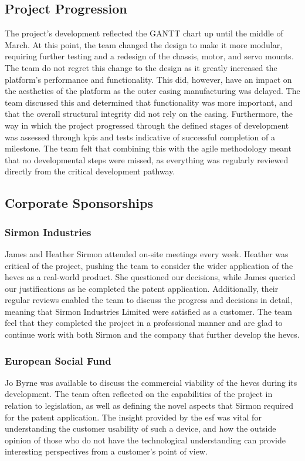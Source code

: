 \documentclass [12pt]{article}
\begin{document}
\subsection{Project Progression}
The project’s development reflected the GANTT chart up until the middle of March. At this point, the team changed the design to make it more modular, requiring further testing and a redesign of the chassis, motor, and servo mounts. The team do not regret this change to the design as it greatly increased the platform’s performance and functionality. This did, however, have an impact on the aesthetics of the platform as the outer casing manufacturing was delayed.  The team discussed this and determined that functionality was more important, and that the overall structural integrity did not rely on the casing. Furthermore, the way in which the project progressed through the defined stages of development was assessed through \gls{kpi}s and tests indicative of successful completion of a milestone. The team felt that combining this with the agile methodology meant that no developmental steps were missed, as everything was regularly reviewed directly from the critical development pathway.  

\subsection{Corporate Sponsorships}

\subsubsection{Sirmon Industries}
James and Heather Sirmon attended on-site meetings every week. Heather was critical of the project, pushing the team to consider the wider application of the \gls{hevcs} as a real-world product. She questioned our decisions, while James queried our justifications as he completed the patent application. Additionally, their regular reviews enabled the team to discuss the progress and decisions in detail, meaning that Sirmon Industries Limited were satisfied as a customer. The team feel that they completed the project in a professional manner and are glad to continue work with both Sirmon and the company that further develop the \gls{hevcs}. 

\subsubsection{European Social Fund}
Jo Byrne was available to discuss the commercial viability of the \gls{hevcs} during its development. The team often reflected on the capabilities of the project in relation to legislation, as well as defining the novel aspects that Sirmon required for the patent application. The insight provided by the \gls{esf} was vital for understanding the customer usability of such a device, and how the outside opinion of those who do not have the technological understanding can provide interesting perspectives from a customer’s point of view.  
\end{document}
